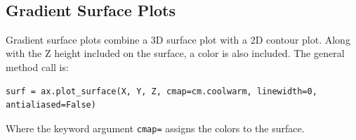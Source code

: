\documentclass{book}
\begin{document}
    \begin{center}
    \end{center}
    { \hspace*{\fill} \\}
    
    \subsection{Gradient Surface Plots}\label{gradient-surface-plots}

    Gradient surface plots combine a 3D surface plot with a 2D contour plot.
Along with the Z height included on the surface, a color is also
included. The general method call is:

\begin{lstlisting}
surf = ax.plot_surface(X, Y, Z, cmap=cm.coolwarm, linewidth=0, antialiased=False)
\end{lstlisting}

Where the keyword argument \lstinline!cmap=! assigns the colors to the
surface.
\end{document}

